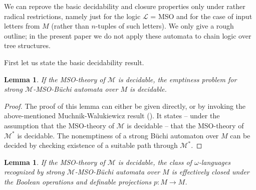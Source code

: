 \documentclass[copyright,creativecommons]{eptcs}
\newtheorem{lemma}[theorem]{Lemma}
\theoremstyle{plain}
\theoremstyle{nonumberplain}
\newtheorem{proof}{Proof}
\newcommand{\m}{\ensuremath{\mathcal{M}}}
\newcommand{\el}{\ensuremath{\mathcal{L}}}
\newcommand{\Mstrong}{\ensuremath{\m^*}}
\begin{document}
We can reprove the basic decidability and closure properties only under rather radical 
restrictions, namely just for the logic $\el$ = MSO 
and for the case of input letters from $M$ (rather than $n$-tuples of such 
letters). We only give a rough outline; in the present paper 
we do not apply these automata to chain logic over tree structures. 
  
First let us state the basic decidability result.

\begin{lemma}
If the MSO-theory of $\m$ is decidable, 
the emptiness problem for strong  $\m$-MSO-B\"uchi automata over $M$ 
is decidable. 
\end{lemma}

\begin{proof}
The proof of this lemma can either be given directly, or by invoking the 
above-mentioned Muchnik-Walukiewicz result (\cite{sem84,wal02}). 
It states -- under the assumption that 
the MSO-theory of $\m$ is decidable -- that the MSO-theory of $\Mstrong$ is 
decidable. The nonemptiness of a strong B\"uchi automaton over $M$ can be 
decided by checking existence of a suitable path through $\Mstrong$. 
\end{proof}

\begin{lemma}
If the MSO-theory of $\m$ is decidable, the 
class of $\omega$-languages recognized by strong $\m$-MSO-B\"uchi automata 
over $M$ is effectively closed under the Boolean operations and 
definable projections $p: M \rightarrow M$.
\end{lemma}
\end{document}
